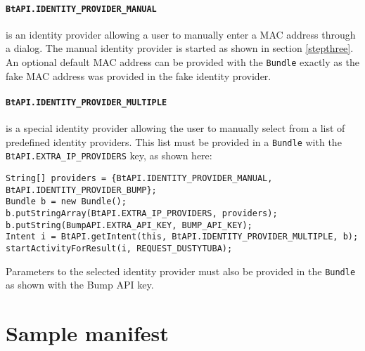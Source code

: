 \documentclass[a4paper,11pt]{article}
\begin{document}
\paragraph{{\tt BtAPI.IDENTITY\_PROVIDER\_MANUAL}}
is an identity provider allowing a user to manually enter a MAC address through a dialog. The manual identity provider is started as shown in section \ref{stepthree}. An optional default MAC address can be provided with the \verb+Bundle+ exactly as the fake MAC address was provided in the fake identity provider.

\paragraph{{\tt BtAPI.IDENTITY\_PROVIDER\_MULTIPLE}}
is a special identity provider allowing the user to manually select from a list of predefined identity providers. This list must be provided in a \verb+Bundle+ with the \verb+BtAPI.EXTRA_IP_PROVIDERS+ key, as shown here:

\footnotesize
\begin{verbatim}
String[] providers = {BtAPI.IDENTITY_PROVIDER_MANUAL, BtAPI.IDENTITY_PROVIDER_BUMP};
Bundle b = new Bundle();
b.putStringArray(BtAPI.EXTRA_IP_PROVIDERS, providers);
b.putString(BumpAPI.EXTRA_API_KEY, BUMP_API_KEY);
Intent i = BtAPI.getIntent(this, BtAPI.IDENTITY_PROVIDER_MULTIPLE, b);
startActivityForResult(i, REQUEST_DUSTYTUBA);
\end{verbatim}
\normalsize

Parameters to the selected identity provider must also be provided in the \verb+Bundle+ as shown with the Bump\texttrademark{} API key.

\clearpage
\appendix

\section{Sample manifest}
\label{sample-manifest}
\end{document}
